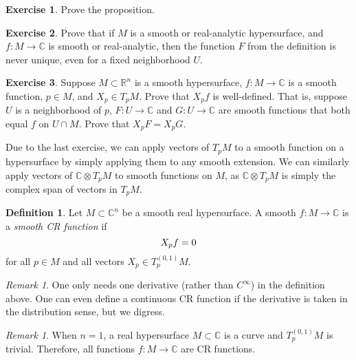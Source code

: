 \documentclass[12pt,openany]{book}
\newcommand{\avoidbreak}{\postdisplaypenalty=100}
\newcommand{\C}{{\mathbb{C}}}
\newcommand{\R}{{\mathbb{R}}}
\newcommand{\myindex}[1]{#1\index{#1}}
\theoremstyle{plain}
\theoremstyle{remark}
\newtheorem{remark}[thm]{Remark}
\theoremstyle{definition}
\newtheorem{defn}[thm]{Definition}
\newenvironment{exbox}{%
    \def\FrameCommand{\vrule width 1pt \relax\hspace{10pt}}%
    \MakeFramed{\advance\hsize-\width\FrameRestore}%
}{%
    \endMakeFramed
}
\theoremstyle{exercise}
\newtheorem{exercise}{Exercise}[section]
\theoremstyle{example}
\begin{document}
\begin{exbox}
\begin{exercise}
Prove the proposition.
\end{exercise}

\begin{exercise}
Prove that if $M$ is a smooth or real-analytic
hypersurface, and $f \colon M \to \C$ is smooth or real-analytic, then the function $F$ from the definition is never unique,
even for a fixed neighborhood $U$.
\end{exercise}

\begin{exercise}
Suppose $M \subset \R^n$ is a smooth hypersurface, $f \colon M \to \C$
is a smooth function, $p \in M$, and $X_p \in T_p M$.  Prove that
$X_p f$ is well-defined.
That is, suppose
$U$ is a neighborhood of $p$,
$F \colon U \to \C$ and $G \colon U \to \C$
are smooth functions that both equal $f$ on $U \cap M$.
Prove that
$X_p F = X_p G$.
\end{exercise}
\end{exbox}

Due to the last exercise, we can apply vectors of $T_p M$ to
a smooth function on a hypersurface by simply applying
them to any smooth extension.  We can similarly apply vectors of
$\C \otimes T_p M$ to smooth functions on $M$, as 
$\C \otimes T_p M$ is simply the complex span of vectors in $T_p M$.

\begin{defn}
Let $M \subset \C^n$ be a smooth real hypersurface.
A smooth $f \colon M \to \C$ is a
\emph{\myindex{smooth CR function}} if
\begin{equation*}
X_p f = 0
\avoidbreak
\end{equation*}
for all $p \in M$ and all vectors $X_p \in T^{(0,1)}_p M$.
\end{defn}

\begin{remark}
One only needs one derivative (rather than $C^\infty$) in the definition
above.
One can even
define a continuous CR function if the derivative is taken in the
distribution sense, but we digress.
\end{remark}

\begin{remark}
When $n=1$, a real hypersurface $M \subset \C$ is a curve and $T^{(0,1)}_p M$
is trivial.  Therefore, all functions $f \colon M \to \C$ are CR functions.
\end{remark}
\end{document}
